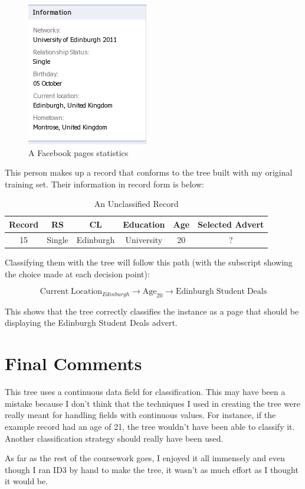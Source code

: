 \documentclass[8pt]{article}
\begin{document}
     \begin{figure}[H]
       \begin{center}
         \includegraphics[scale=0.6]{Facebook.png}
       \end{center}
       \caption{A Facebook pages statistics}
     \end{figure}

     This person makes up a record that conforms to the tree built with my original training set.
     Their information in record form is below:

     \begin{table}[H] 
       \centering
       \caption{An Unclassified Record}
       \begin{tabular}{|c|c|c|c|c||c|}
         \hline
         \textbf{Record} & \textbf{RS} & \textbf{CL} &\textbf{Education} & \textbf{Age} & \textbf{Selected Advert} \\
          \hline
          15 & Single    &Edinburgh  & University & 20 & ? \\
          \hline
       \end{tabular}
     \end{table}
 
     Classifying them with the tree will follow this path (with the subscript showing the choice made at each decision point):

     \begin{equation}
       \mathrm{Current\; Location}_{Edinburgh} \rightarrow \mathrm{Age}_{20} \rightarrow \mathrm{Edinburgh\; Student\; Deals} 
     \end{equation}

     This shows that the tree correctly classifies the instance as a page that should be displaying the Edinburgh Student
     Deals advert.

  \section{Final Comments}
    This tree uses a continuous data field for classification. This may have been a mistake because I don't think that
    the techniques I used in creating the tree were really meant for handling fields with continuous values. For instance,
    if the example record had an age of 21, the tree wouldn't have been able to classify it. Another classification strategy
    should really have been used.

    As far as the rest of the coursework goes, I enjoyed it all immensely and even though I ran ID3 by hand to make the tree,     it wasn't as much effort as I thought it would be.                                             
    
\end{document}
